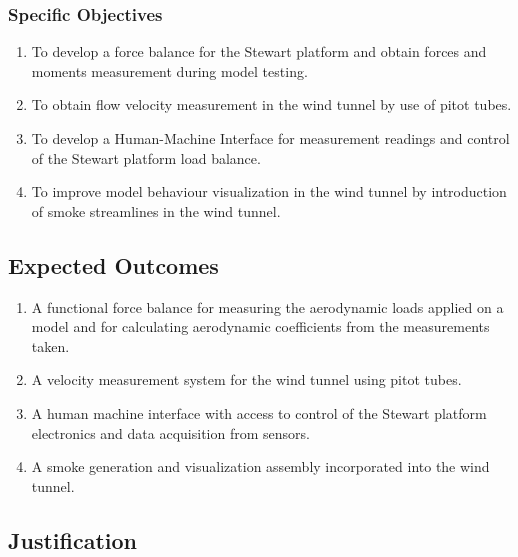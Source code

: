 \subsubsection{Specific Objectives}
\begin{enumerate}
    \item To develop a force balance for the Stewart platform and obtain forces and moments measurement during model testing.
    \item To obtain flow velocity measurement in the wind tunnel by use of pitot tubes.
    \item To develop a Human-Machine Interface for measurement readings and control of the Stewart platform load balance.
    \item To improve model behaviour visualization in the wind tunnel by introduction of smoke streamlines in the wind tunnel.
\end{enumerate}
\subsection{Expected Outcomes}
\begin{enumerate}
    \item A functional force balance for measuring the aerodynamic loads applied on a model
          and for calculating aerodynamic coefficients from the measurements taken.
    \item A velocity measurement system for the wind tunnel using pitot tubes.
    \item A human machine interface with access to control of the Stewart platform electronics
          and data acquisition from sensors.
    \item A smoke generation and visualization assembly incorporated into the wind tunnel.
\end{enumerate}

\subsection{Justification}